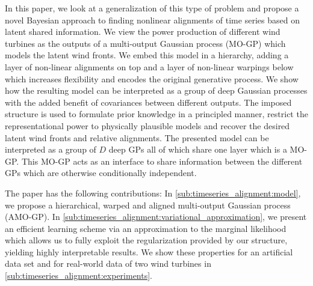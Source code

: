 In this paper, we look at a generalization of this type of problem and propose a novel Bayesian approach to finding nonlinear alignments of time series based on latent shared information.
We view the power production of different wind turbines as the outputs of a multi-output Gaussian process (MO-GP) \parencite{alvarez_kernels_2011} which models the latent wind fronts.
We embed this model in a hierarchy, adding a layer of non-linear alignments on top and a layer of non-linear warpings \parencites{snelson_warped_2004,lazaro-gredilla_bayesian_2012} below which increases flexibility and encodes the original generative process.
We show how the resulting model can be interpreted as a group of deep Gaussian processes with the added benefit of covariances between different outputs.
The imposed structure is used to formulate prior knowledge in a principled manner, restrict the representational power to physically plausible models and  recover the desired latent wind fronts and relative alignments.
The presented model can be interpreted as a group of $D$ deep GPs all of which share one layer which is a MO-GP.
This MO-GP acts as an interface to share information between the different GPs which are otherwise conditionally independent.

The paper has the following contributions:
In \cref{sub:timeseries_alignment:model}, we propose a hierarchical, warped and aligned  multi-output Gaussian process (AMO-GP).
In \cref{sub:timeseries_alignment:variational_approximation}, we present an efficient learning scheme via an approximation to the marginal likelihood which allows us to fully exploit the regularization provided by our structure, yielding highly interpretable results.
We show these properties for an artificial data set and for real-world data of two wind turbines in \cref{sub:timeseries_alignment:experiments}.


